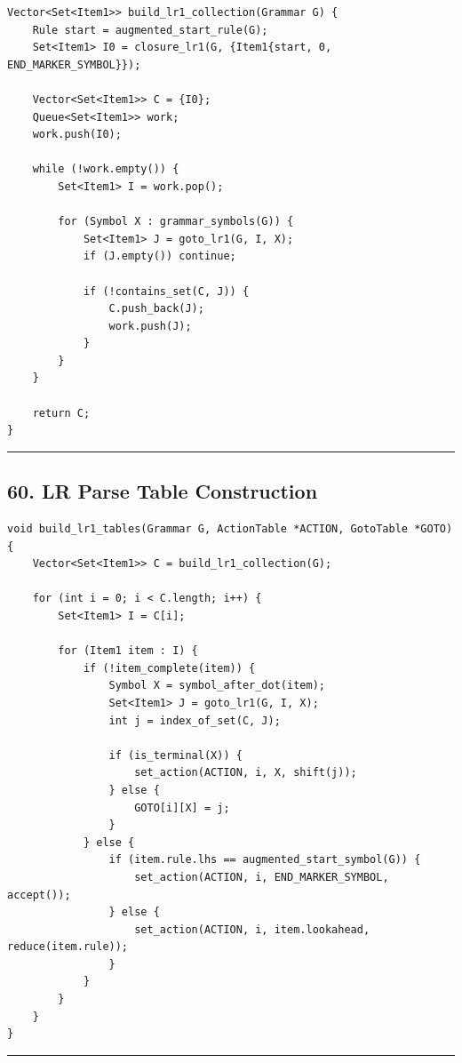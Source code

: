 \documentclass[10pt,letterpaper]{article}
\begin{document}
\begin{verbatim}
Vector<Set<Item1>> build_lr1_collection(Grammar G) {
    Rule start = augmented_start_rule(G);
    Set<Item1> I0 = closure_lr1(G, {Item1{start, 0, END_MARKER_SYMBOL}});

    Vector<Set<Item1>> C = {I0};
    Queue<Set<Item1>> work;
    work.push(I0);

    while (!work.empty()) {
        Set<Item1> I = work.pop();

        for (Symbol X : grammar_symbols(G)) {
            Set<Item1> J = goto_lr1(G, I, X);
            if (J.empty()) continue;

            if (!contains_set(C, J)) {
                C.push_back(J);
                work.push(J);
            }
        }
    }

    return C;
}
\end{verbatim}

\medskip\hrule\medskip

\subsection*{60. LR Parse Table Construction}

\begin{verbatim}
void build_lr1_tables(Grammar G, ActionTable *ACTION, GotoTable *GOTO) {
    Vector<Set<Item1>> C = build_lr1_collection(G);

    for (int i = 0; i < C.length; i++) {
        Set<Item1> I = C[i];

        for (Item1 item : I) {
            if (!item_complete(item)) {
                Symbol X = symbol_after_dot(item);
                Set<Item1> J = goto_lr1(G, I, X);
                int j = index_of_set(C, J);

                if (is_terminal(X)) {
                    set_action(ACTION, i, X, shift(j));
                } else {
                    GOTO[i][X] = j;
                }
            } else {
                if (item.rule.lhs == augmented_start_symbol(G)) {
                    set_action(ACTION, i, END_MARKER_SYMBOL, accept());
                } else {
                    set_action(ACTION, i, item.lookahead, reduce(item.rule));
                }
            }
        }
    }
}
\end{verbatim}

\medskip\hrule\medskip

\end{document}
